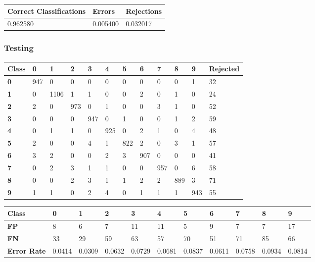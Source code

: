\documentclass[
  a4paper,            %
  DIV=10,             %
  oneside,            %
  BCOR=5mm,           %
  parskip=half,       %
  numbers=noenddot,   %
  bibtotoc,           %
  listof=totoc,        %
  article
]{scrreprt}
\begin{document}
\begin{center}
  \begin{tabular}{|p{5cm}|p{3cm}|p{3cm}|}
    \hline
    \textbf{Correct Classifications} & \textbf{Errors} & \textbf{Rejections} \\
    \hline
    0.962580 & 0.005400 & 0.032017 \\
    \hline
  \end{tabular}
\end{center}
\subsubsection{Testing}
\begin{center}
  \begin{tabular}{|p{1cm}|p{1cm}|p{1cm}|p{1cm}|p{1cm}|p{1cm}|p{1cm}|p{1cm}|p{1cm}|p{1cm}|p{1cm}|p{1.7cm}|}
    \hline
    \textbf{Class} & \textbf{0} & \textbf{1} & \textbf{2} & \textbf{3} & \textbf{4} & \textbf{5} & \textbf{6} & \textbf{7} & \textbf{8} & \textbf{9} & \textbf{Rejected} \\
    \hline
    \textbf{0} & 947 & 0 & 0 & 0 & 0 & 0 & 0 & 0 & 0 & 1 & 32 \\
    \hline
    \textbf{1} & 0 & 1106 & 1 & 1 & 0 & 0 & 2 & 0 & 1 & 0 & 24 \\
    \hline
    \textbf{2} & 2 & 0 & 973 & 0 & 1 & 0 & 0 & 3 & 1 & 0 & 52 \\
    \hline
    \textbf{3} & 0 & 0 & 0 & 947 & 0 & 1 & 0 & 0 & 1 & 2 & 59 \\
    \hline
    \textbf{4} & 0 & 1 & 1 & 0 & 925 & 0 & 2 & 1 & 0 & 4 & 48 \\
    \hline
    \textbf{5} & 2 & 0 & 0 & 4 & 1 & 822 & 2 & 0 & 3 & 1 & 57 \\
    \hline
    \textbf{6} & 3 & 2 & 0 & 0 & 2 & 3 & 907 & 0 & 0 & 0 & 41 \\
    \hline
    \textbf{7} & 0 & 2 & 3 & 1 & 1 & 0 & 0 & 957 & 0 & 6 & 58 \\
    \hline
    \textbf{8} & 0 & 0 & 2 & 3 & 1 & 1 & 2 & 2 & 889 & 3 & 71 \\
    \hline
    \textbf{9} & 1 & 1 & 0 & 2 & 4 & 0 & 1 & 1 & 1 & 943 & 55 \\
    \hline
  \end{tabular}
\end{center}

\begin{center}
  \begin{tabular}{|p{1cm}|p{1cm}|p{1cm}|p{1cm}|p{1cm}|p{1cm}|p{1cm}|p{1cm}|p{1cm}|p{1cm}|p{1cm}|}
    \hline
    \textbf{Class} & \textbf{0} & \textbf{1} & \textbf{2} & \textbf{3} & \textbf{4} & \textbf{5} & \textbf{6} & \textbf{7} & \textbf{8} & \textbf{9} \\
    \hline
    \textbf{FP} & 8 & 6 & 7 & 11 & 11 & 5 & 9 & 7 & 7 & 17 \\
    \hline
    \textbf{FN} & 33 & 29 & 59 & 63 & 57 & 70 & 51 & 71 & 85 & 66 \\
    \hline
    \textbf{Error Rate} & 0.0414 & 0.0309 & 0.0632 & 0.0729 & 0.0681 & 0.0837 & 0.0611 & 0.0758 & 0.0934 & 0.0814 \\
    \hline
  \end{tabular}
\end{center}
\end{document}

